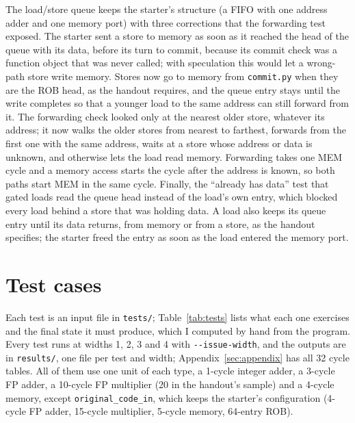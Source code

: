 \documentclass[11pt]{article}
\newcommand{\code}[1]{\texttt{#1}}
\begin{document}
The load/store queue keeps the starter's structure (a FIFO with one address adder and one
memory port) with three corrections that the forwarding test exposed. The starter sent a store
to memory as soon as it reached the head of the queue with its data, before its turn to
commit, because its commit check was a function object that was never called; with
speculation this would let a wrong-path store write memory. Stores now go to memory from
\code{commit.py} when they are the ROB head, as the handout requires, and the queue entry
stays until the write completes so that a younger load to the same address can still forward
from it. The forwarding check looked only at the nearest older store, whatever its address;
it now walks the older stores from nearest to farthest, forwards from the first one with the
same address, waits at a store whose address or data is unknown, and otherwise lets the load
read memory. Forwarding takes one MEM cycle and a memory access starts the cycle after the
address is known, so both paths start MEM in the same cycle. Finally, the ``already has
data'' test that gated loads read the queue head instead of the load's own entry, which
blocked every load behind a store that was holding data. A load also keeps its queue entry
until its data returns, from memory or from a store, as the handout specifies; the starter
freed the entry as soon as the load entered the memory port.

\section{Test cases}
\label{sec:tests}

Each test is an input file in \code{tests/}; Table~\ref{tab:tests} lists what each one
exercises and the final state it must produce, which I computed by hand from the program.
Every test runs at widths 1, 2, 3 and 4 with \code{-{}-issue-width}, and the outputs are in
\code{results/}, one file per test and width; Appendix~\ref{sec:appendix} has all 32 cycle
tables. All of them use one unit of each type,
a 1-cycle integer adder, a 3-cycle FP adder, a 10-cycle FP multiplier (20 in the handout's
sample) and a 4-cycle memory, except \code{original\_code\_in}, which keeps the starter's
configuration (4-cycle FP adder, 15-cycle multiplier, 5-cycle memory, 64-entry ROB).
\end{document}
